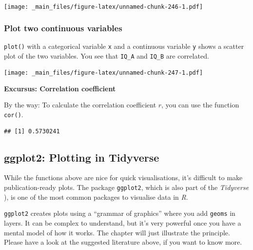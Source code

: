 \documentclass[
]{scrartcl}
\newenvironment{Shaded}{\begin{snugshade}}{\end{snugshade}}
\newcommand{\AttributeTok}[1]{\textcolor[rgb]{0.13,0.29,0.53}{#1}}
\newcommand{\FunctionTok}[1]{\textcolor[rgb]{0.13,0.29,0.53}{\textbf{#1}}}
\newcommand{\NormalTok}[1]{#1}
\newcommand{\SpecialCharTok}[1]{\textcolor[rgb]{0.81,0.36,0.00}{\textbf{#1}}}
\newenvironment{webexsolution}[1]
    {\par\tiny\textbf{#1}}
    {\par}
\newcommand{\webexhide}[1]{\begin{webexsolution}{#1}}
\newcommand{\webexunhide}{\end{webexsolution}}
\begin{document}
\texttt{[image: \_main\_files/figure-latex/unnamed-chunk-246-1.pdf]}

\subsubsection{Plot two continuous variables}\label{plot-two-continuous-variables}

\texttt{plot()} with a categorical variable \texttt{x} and a continuous variable \texttt{y} shows a scatter plot of the two variables. You see that \texttt{IQ\_A} and \texttt{IQ\_B} are correlated.

\begin{Shaded}
\end{Shaded}

\texttt{[image: \_main\_files/figure-latex/unnamed-chunk-247-1.pdf]}
\webexhide{Excursus: Correlation coefficient}

By the way: To calculate the correlation coefficient \(r\), you can use the function \texttt{cor()}.

\begin{Shaded}
\end{Shaded}

\begin{verbatim}
## [1] 0.5730241
\end{verbatim}

\webexunhide

\subsection{ggplot2: Plotting in Tidyverse}\label{ggplot2-plotting-in-tidyverse}

While the functions above are nice for quick visualisations, it's difficult to make publication-ready plots. The package \texttt{ggplot2}, which is also part of the \emph{Tidyverse} ), is one of the most common packages to visualise data in \emph{R}.

\texttt{ggplot2} creates plots using a ``grammar of graphics'' where you add \texttt{geoms} in layers. It can be complex to understand, but it's very powerful once you have a mental model of how it works. The chapter will just illustrate the principle. Please have a look at the suggested literature above, if you want to know more.
\end{document}

